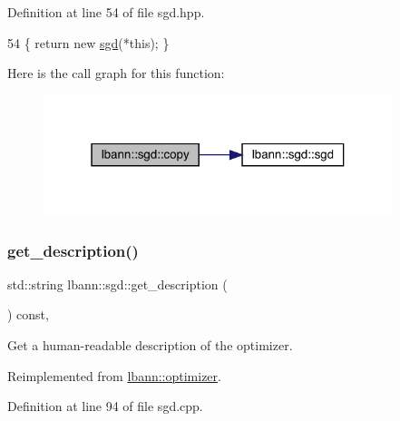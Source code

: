 Definition at line 54 of file sgd.\+hpp.


\begin{DoxyCode}
54 \{ \textcolor{keywordflow}{return} \textcolor{keyword}{new} \hyperlink{classlbann_1_1sgd_a73baa574a5129872fe25f2a419c86baa}{sgd}(*\textcolor{keyword}{this}); \}
\end{DoxyCode}
Here is the call graph for this function\+:\nopagebreak
\begin{figure}[H]
\begin{center}
\leavevmode
\includegraphics[width=289pt]{classlbann_1_1sgd_a91572d383ad42584bf917e7d62bebe82_cgraph}
\end{center}
\end{figure}
\mbox{\label{classlbann_1_1sgd_a2022661b9ef83e418a0a980207cb231e}} 
\subsubsection{\texorpdfstring{get\+\_\+description()}{get\_description()}}
{\footnotesize\ttfamily std\+::string lbann\+::sgd\+::get\+\_\+description (\begin{DoxyParamCaption}{ }\end{DoxyParamCaption}) const\hspace{0.3cm}{\ttfamily [override]}, {\ttfamily [virtual]}}

Get a human-\/readable description of the optimizer. 

Reimplemented from \hyperlink{classlbann_1_1optimizer_a66bb8d28dfb41452ac1a75a3efd47723}{lbann\+::optimizer}.



Definition at line 94 of file sgd.\+cpp.


